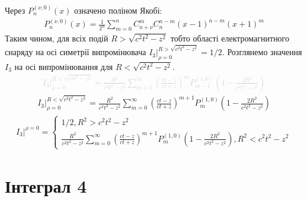 Через $ P_n^{(\nu,0)} (x) $ означено поліном Якобі:
%
\begin{equation*} \begin{aligned}
P_n^{(\nu,0)} (x) = \frac{1}{2^n} \sum_{m=0}^{n} C_{n+\nu}^{m} C_{n}^{n-m} 
\left( x - 1 \right)^{n-m} \left( x + 1 \right)^m 
\end{aligned} \end{equation*}
%
Таким чином, для всіх подій $ R > \sqrt{c^2 t^2 - z^2} $ тобто області 
електромагнитного снаряду на осі симетрії випромінювача 
$ \left. I_3 \right|_{\rho = 0}^{R > \sqrt{c^2 t^2 - z^2}} = 1/2 $. Розглянемо 
значення $ I_3 $ на осі випромінювання для $ R < \sqrt{c^2 t^2 - z^2} $.
%
\textcolor{lightgray}{ \begin{equation*} \begin{aligned}
\left. I_3 \right|_{\rho = 0}^{R < \sqrt{c^2 t^2 - z^2}} = 
\frac{R^2}{c^2 t^2 - z^2} \sum_{m=1}^{\infty} 
\left( \frac{ct - z}{ct + z} \right)^m P_{m-1}^{(1,0)} 
\left( 1 - \frac{2R^2}{c^2 t^2 - z^2} \right)
\end{aligned} \end{equation*} }
%
\begin{equation*} \begin{aligned}
\left. I_3 \right|_{\rho = 0}^{R < \sqrt{c^2 t^2 - z^2}} = 
\frac{R^2}{c^2 t^2 - z^2} \sum_{m=0}^{\infty} 
\left( \frac{ct - z}{ct + z} \right)^{m+1} P_{m}^{(1,0)} 
\left( 1 - \frac{2R^2}{c^2 t^2 - z^2} \right)
\end{aligned} \end{equation*}
%
\begin{equation*} \begin{aligned}
\left. I_3 \right|^{\rho = 0} = \begin{cases} 1/2, R^2 > c^2 t^2 - z^2 \\
\frac{R^2}{c^2 t^2 - z^2} \sum_{m=0}^{\infty} 
\left( \frac{ct - z}{ct + z} \right)^{m+1} P_{m}^{(1,0)} 
\left( 1 - \frac{2R^2}{c^2 t^2 - z^2} \right), 
R^2 < c^2 t^2 - z^2 \end{cases}
\end{aligned} \end{equation*}

\section{Інтеграл 4}

